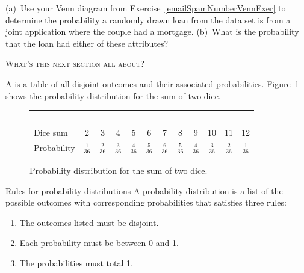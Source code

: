 \documentclass{ccg-topic}
\begin{document}
\begin{todo}
(a)~Use your Venn diagram from Exercise~\ref{emailSpamNumberVennExer} to determine the
probability a randomly drawn loan from the 
data set is from a joint application where the couple had
a mortgage.
(b)~What is the probability that the loan had either of
these attributes?\footnotemark
\end{todo}




\vspace{1em}\noindent\textsc{What's this next section all about?} 
\vspace{1em}

A  is a table of all disjoint outcomes and their associated probabilities. Figure~\ref{diceProb} shows the probability distribution for the sum of two dice. 

\begin{figure}[h] \small
\centering
\begin{tabular}{l ccc ccc ccc cc}
  \hline
  \ \vspace{-3mm} \\
Dice sum\vspace{0.3mm} & 2 & 3 & 4 & 5 & 6 & 7 & 8 & 9 & 10 & 11 & 12  \\
Probability & $\frac{1}{36}$ & $\frac{2}{36}$ & $\frac{3}{36}$ & $\frac{4}{36}$ & $\frac{5}{36}$ & $\frac{6}{36}$ & $\frac{5}{36}$ & $\frac{4}{36}$ & $\frac{3}{36}$ & $\frac{2}{36}$ & $\frac{1}{36}$\vspace{1mm} \\
   \hline
\end{tabular}
\caption{Probability distribution for the sum of two dice.}
\label{diceProb}
\end{figure}

\begin{defn}{Rules for probability distributions}
A probability distribution is a list of the possible outcomes with corresponding probabilities that satisfies three rules: \vspace{-2mm}
\begin{enumerate}
\setlength{\itemsep}{0mm}
\item The outcomes listed must be disjoint.
\item Each probability must be between 0 and 1.
\item The probabilities must total 1. \vspace{1mm}
\end{enumerate}
\end{defn}
\end{document}
